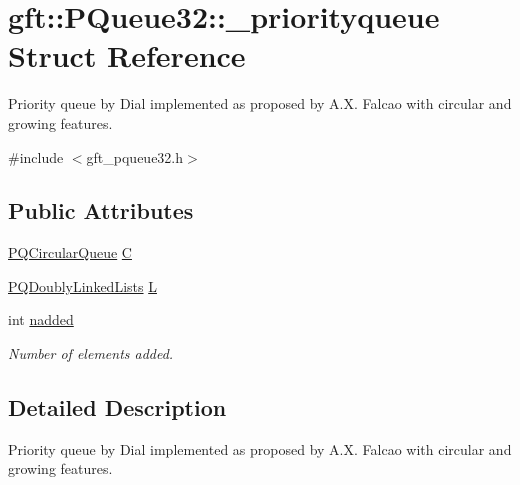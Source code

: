 \hypertarget{structgft_1_1PQueue32_1_1__priorityqueue}{\section{gft\-:\-:P\-Queue32\-:\-:\-\_\-priorityqueue Struct Reference}
\label{structgft_1_1PQueue32_1_1__priorityqueue}
}


Priority queue by Dial implemented as proposed by A.\-X. Falcao with circular and growing features.  




{\ttfamily \#include $<$gft\-\_\-pqueue32.\-h$>$}

\subsection*{Public Attributes}
\begin{DoxyCompactItemize}
\item 
\hyperlink{namespacegft_1_1PQueue32_aefaf7157b45d644a8eed22d16d5ae865}{P\-Q\-Circular\-Queue} \hyperlink{structgft_1_1PQueue32_1_1__priorityqueue_a6d54b970bf65337bb5b50b9e93b8af2c}{C}
\item 
\hyperlink{namespacegft_1_1PQueue32_a0f1b06428dba7567e75fedd80ecadc05}{P\-Q\-Doubly\-Linked\-Lists} \hyperlink{structgft_1_1PQueue32_1_1__priorityqueue_a52881ee4fa383a2c8a237ebdc03a4c21}{L}
\item 
int \hyperlink{structgft_1_1PQueue32_1_1__priorityqueue_af5c8ac0e0628e1ebf95693aa7e2a40a3}{nadded}
\begin{DoxyCompactList}\small\item\em Number of elements added. \end{DoxyCompactList}\end{DoxyCompactItemize}


\subsection{Detailed Description}
Priority queue by Dial implemented as proposed by A.\-X. Falcao with circular and growing features. 

